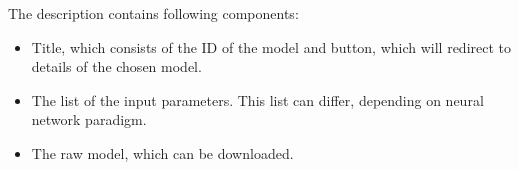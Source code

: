 \begin{itemize}
The description contains following components:
\begin{itemize}
\item Title, which consists of the ID of the model and button, which will redirect to details of the chosen model.
\item The list of the input parameters. This list can differ, depending on neural network paradigm. 
\item The raw model, which can be downloaded. 
\end{itemize}

\end{itemize}

